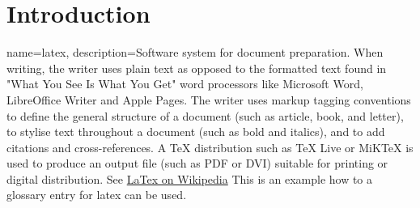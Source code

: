 \documentclass[12pt,oneside]{report}
\begin{document}
\tableofcontents
\chapter{Introduction}
{ name=latex,
  description={Software system for document preparation. When writing, the writer uses plain text as opposed to the formatted text found in "What You See Is What You Get" word processors like Microsoft Word, LibreOffice Writer and Apple Pages. The writer uses markup tagging conventions to define the general structure of a document (such as article, book, and letter), to stylise text throughout a document (such as bold and italics), and to add citations and cross-references. A TeX distribution such as TeX Live or MiKTeX is used to produce an output file (such as PDF or DVI) suitable for printing or digital distribution. See \href{https://en.wikipedia.org/wiki/LaTeX}{LaTex on Wikipedia}}
}
This is an example how to a glossary entry for 
 \gls{latex} can be used.\\
\printglossaries
\end{document}
